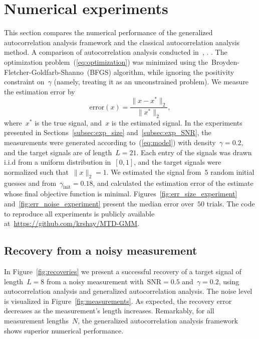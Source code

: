 \documentclass{article}
\newcommand{\rev}[1]{{\color{magenta}{#1}}}
\begin{document}
\section{Numerical experiments}
\label{sec:numerical}
This section compares the numerical performance of the generalized autocorrelation analysis framework and the classical autocorrelation analysis method. A comparison of autocorrelation analysis \rev{to a naive method that detects and extracts the signal occurrences, and then averages, was} conducted in~\cite{lan2020multi}, \cite{kreymer2021two}. \rev{While this method works well in a high SNR environment, it fails in low SNR regimes---the focal point of this paper---and thus omitted}. The optimization problem~(\ref{eq:optimization}) was minimized using the~\mbox{Broyden-Fletcher-Goldfarb-Shanno}~(BFGS) algorithm, while ignoring the positivity constraint on~$\gamma$ (namely, treating it as an unconstrained problem).  We measure the estimation error by
\begin{equation*}
\text{error}(x) = \frac{\|x - x^*\|_2}{\|x^*\|_2},
\end{equation*}
where~$x^*$ is the true signal, and~$x$ is the estimated signal. In the experiments presented in Sections~\ref{subsec:exp_size} and~\ref{subsec:exp_SNR}, the measurements were generated according to~(\ref{eq:model}) with density~\mbox{$\gamma = 0.2$}, and the target signals are of length~\mbox{$L = 21$}. Each entry of the signals was drawn i.i.d from a uniform distribution in~$[0,1]$, and the target signals were normalized such that~$\|x\|_2  =1$. We estimated the signal from~$5$ random initial guesses \rev{that were generated similarly to the ground truth signal} and from~\mbox{$\gamma_{\text{init}} = 0.18$}, and calculated the estimation error of the \rev{signal} estimate whose final objective function is minimal. Figures~\ref{fig:err_size_experiment} and~\ref{fig:err_noise_experiment} present the median error over~$50$ trials. The code to reproduce all experiments is publicly available at~\url{https://github.com/krshay/MTD-GMM}.

\subsection{Recovery from a noisy measurement}
\label{subsec:exp_recovery}
In Figure~\ref{fig:recoveries} we present a successful recovery of a target signal of length~\mbox{$L = 8$} from a noisy measurement with~\mbox{$\text{SNR} = 0.5$} and~\mbox{$\gamma = 0.2$}, using autocorrelation analysis and generalized autocorrelation analysis. The noise level is visualized in Figure~\ref{fig:measurements}. As expected, the recovery error decreases  as the measurement's length increases. Remarkably, for all measurement lengths~$N$, the generalized autocorrelation analysis framework shows superior numerical performance.
\end{document}
